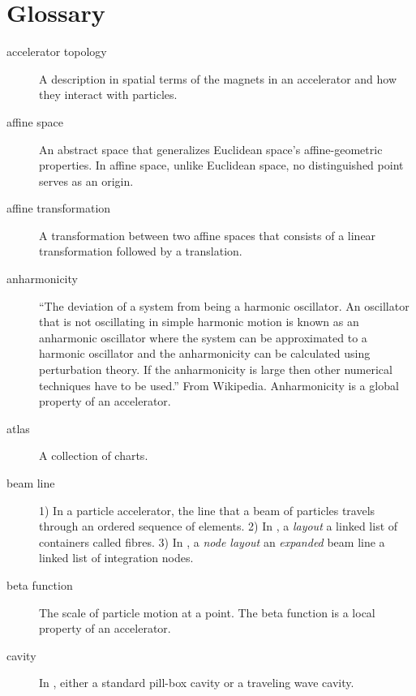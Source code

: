 
\chapter{Glossary}

\begin{description}
  \item[accelerator topology]
A description in spatial terms of the magnets in an accelerator and
how they interact with particles.

  \item[affine space]
An abstract space that generalizes Euclidean space's affine-geometric properties.
In affine space, unlike Euclidean space, no distinguished point serves as an origin.

  \item[affine transformation]
A transformation between two affine spaces that consists of a linear transformation
followed by a translation.

  \item[anharmonicity]
``The deviation of a system from being a harmonic oscillator. An
oscillator that is not oscillating in simple harmonic motion is known
as an anharmonic oscillator where the system can be approximated to
a harmonic oscillator and the anharmonicity can be calculated using
perturbation theory. If the anharmonicity is large then other numerical
techniques have to be used.'' From Wikipedia. Anharmonicity is a
global property of an accelerator.

  \item[atlas]
A collection of charts.

  \item[beam line]
1) In a particle accelerator, the line that a beam of particles travels
through an ordered sequence of elements. 2) In \PTC, a \emph{layout
}\textendash{} a linked list of containers called fibres. 3) In \PTC,
a \emph{node layout }\textendash{} an \emph{expanded }beam line \textendash{}
a linked list of integration nodes.

  \item[beta function]
The scale of particle motion at a point. The beta function is a local property of an accelerator.

  \item[cavity]
In \PTC, either a standard pill-box cavity or a traveling wave cavity.


\end{description}
